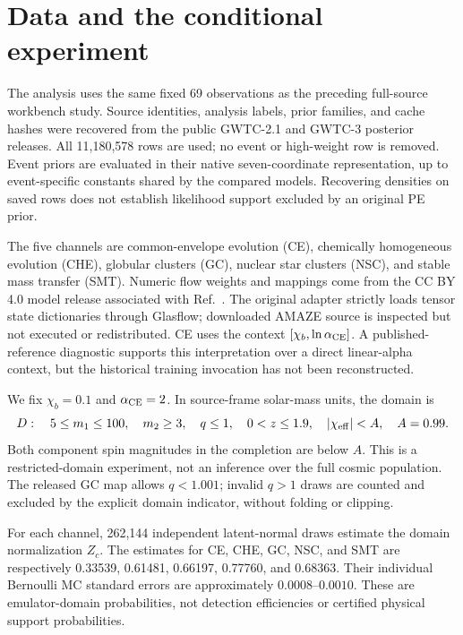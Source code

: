\section{Data and the conditional experiment}
The analysis uses the same fixed 69 observations as the preceding full-source workbench study. Source identities, analysis labels, prior families, and cache hashes were recovered from the public GWTC-2.1 and GWTC-3 posterior releases. All 11,180,578 rows are used; no event or high-weight row is removed. Event priors are evaluated in their native seven-coordinate representation, up to event-specific constants shared by the compared models. Recovering densities on saved rows does not establish likelihood support excluded by an original PE prior.

The five channels are common-envelope evolution (CE), chemically homogeneous evolution (CHE), globular clusters (GC), nuclear star clusters (NSC), and stable mass transfer (SMT). Numeric flow weights and mappings come from the CC BY 4.0 model release associated with Ref.~\cite{colloms}. The original adapter strictly loads tensor state dictionaries through Glasflow; downloaded AMAZE source is inspected but not executed or redistributed. CE uses the context $[\chi_b,\ln\alpha_{\rm CE}]$. A published-reference diagnostic supports this interpretation over a direct linear-alpha context, but the historical training invocation has not been reconstructed.

We fix $\chi_b=0.1$ and $\alpha_{\rm CE}=2$. In source-frame solar-mass units, the domain is
\begin{equation}\label{eq:domain}
D:\quad 5\le m_1\le100,\quad m_2\ge3,\quad q\le1,\quad0<z\le1.9,\quad |\chi_{\rm eff}|<A,\quad A=0.99.
\end{equation}
Both component spin magnitudes in the completion are below $A$. This is a restricted-domain experiment, not an inference over the full cosmic population. The released GC map allows $q<1.001$; invalid $q>1$ draws are counted and excluded by the explicit domain indicator, without folding or clipping.

For each channel, 262,144 independent latent-normal draws estimate the domain normalization $Z_c$. The estimates for CE, CHE, GC, NSC, and SMT are respectively 0.33539, 0.61481, 0.66197, 0.77760, and 0.68363. Their individual Bernoulli MC standard errors are approximately $0.0008$--$0.0010$. These are emulator-domain probabilities, not detection efficiencies or certified physical support probabilities.

